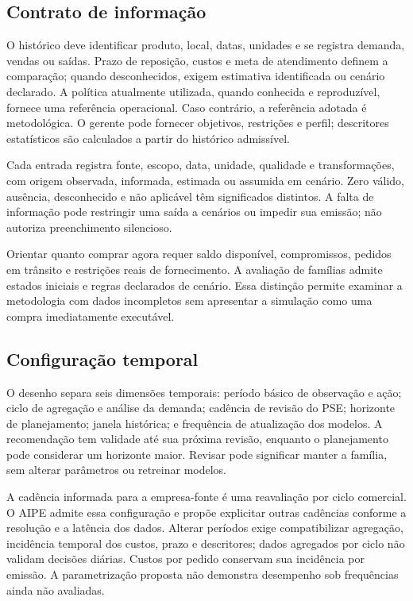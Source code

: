 \subsection{Contrato de informação}
O histórico deve identificar produto, local, datas, unidades e se registra demanda, vendas ou saídas. Prazo de reposição, custos e meta de atendimento definem a comparação; quando desconhecidos, exigem estimativa identificada ou cenário declarado. A política atualmente utilizada, quando conhecida e reproduzível, fornece uma referência operacional. Caso contrário, a referência adotada é metodológica. O gerente pode fornecer objetivos, restrições e perfil; descritores estatísticos são calculados a partir do histórico admissível.

Cada entrada registra fonte, escopo, data, unidade, qualidade e transformações, com origem observada, informada, estimada ou assumida em cenário. Zero válido, ausência, desconhecido e não aplicável têm significados distintos. A falta de informação pode restringir uma saída a cenários ou impedir sua emissão; não autoriza preenchimento silencioso.

Orientar quanto comprar agora requer saldo disponível, compromissos, pedidos em trânsito e restrições reais de fornecimento. A avaliação de famílias admite estados iniciais e regras declarados de cenário. Essa distinção permite examinar a metodologia com dados incompletos sem apresentar a simulação como uma compra imediatamente executável.

\subsection{Configuração temporal}
O desenho separa seis dimensões temporais: período básico de observação e ação; ciclo de agregação e análise da demanda; cadência de revisão do PSE; horizonte de planejamento; janela histórica; e frequência de atualização dos modelos. A recomendação tem validade até sua próxima revisão, enquanto o planejamento pode considerar um horizonte maior. Revisar pode significar manter a família, sem alterar parâmetros ou retreinar modelos.

A cadência informada para a empresa-fonte é uma reavaliação por ciclo comercial. O AIPE admite essa configuração e propõe explicitar outras cadências conforme a resolução e a latência dos dados. Alterar períodos exige compatibilizar agregação, incidência temporal dos custos, prazo e descritores; dados agregados por ciclo não validam decisões diárias. Custos por pedido conservam sua incidência por emissão. A parametrização proposta não demonstra desempenho sob frequências ainda não avaliadas.


